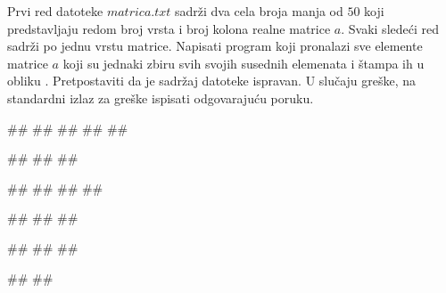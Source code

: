 \begin{Exercise}[label=p3_iv4]         
Prvi red datoteke $matrica.txt$ sadrži dva cela broja manja od
$50$ koji predstavljaju redom broj vrsta i broj kolona realne matrice
$a$. Svaki sledeći red sadrži po jednu vrstu matrice. Napisati
program koji pronalazi sve elemente matrice $a$ koji su jednaki zbiru
svih svojih susednih elemenata i štampa ih u obliku
. 
Pretpostaviti da je sadržaj datoteke ispravan.
U slučaju greške, na standardni izlaz za greške ispisati odgovarajuću poruku.

\begin{minitest}
\begin{upotreba}{1}
##
##
##
##
##

#\naslovIzlaz#
##
##
\end{upotreba}
\end{minitest}
\begin{minitest}
\begin{upotreba}{2}
##
##
##
##

#\naslovIzlaz#
##
##
\end{upotreba}
\end{minitest}
\begin{minitest}
\begin{upotreba}{3}
##
##
##

#\naslovIzlaz#
##
\end{upotreba}
\end{minitest}
\end{Exercise}
\begin{Answer}[ref=p3_iv4]
\end{Answer}


